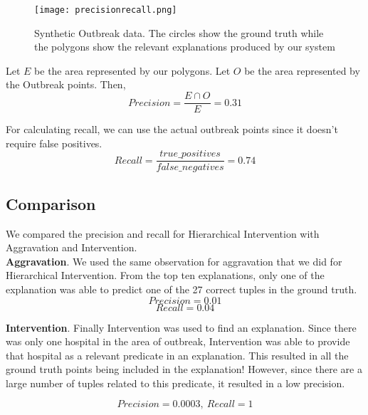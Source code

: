 \begin{figure}[h]
\texttt{[image: precisionrecall.png]}
\caption{Synthetic Outbreak data. The circles show the ground truth while the polygons show the relevant explanations produced by our system}
\label{fig:precisionrecall}
\end{figure}

Let $E$ be the area represented by our polygons. Let $O$ be the area represented by the Outbreak points. Then,
$$Precision = \frac{E \cap O}{E} = 0.31$$

For calculating recall, we can use the actual outbreak points since it doesn't require false positives.
$$Recall = \frac{true\_positives}{false\_negatives} = 0.74$$




\subsection{Comparison}
We compared the precision and recall for Hierarchical Intervention with Aggravation and Intervention.
\\
\textbf{Aggravation}. We used the same observation for aggravation that we did for Hierarchical Intervention. From the top ten explanations, only one of the explanation was able to predict one of the 27 correct tuples in the ground truth.
$$Precision = 0.01$$
$$Recall = 0.04$$


\textbf{Intervention}. Finally Intervention was used to find an explanation. Since there was only one hospital in the area of outbreak, Intervention was able to provide that hospital as a relevant predicate in an explanation. This resulted in all the ground truth points being included in the explanation! However, since there are a large number of tuples related to this predicate, it resulted in a low precision.

$$Precision = 0.0003,\ Recall = 1$$









